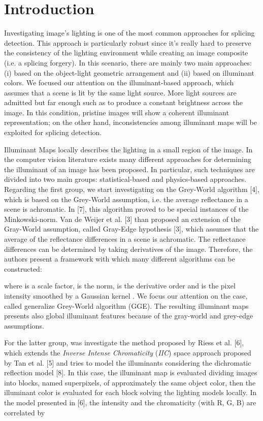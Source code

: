 \chapter*{Introduction}

Investigating image's lighting is one of the most common approaches for splicing detection. This approach is particularly robust since it's really hard to preserve the consistency of the lighting environment while creating an image composite (i.e. a splicing forgery). 
In this scenario, there are mainly two main approaches: (i) based on the object-light geometric arrangement and (ii) based on illuminant colors. We focused our attention on the illuminant-based approach, which assumes that a scene is lit by the same light source. More light sources are admitted but far enough such as to produce a constant brightness across the image. In this condition, pristine images will show a coherent illuminant representation; on the other hand, inconsistencies among illuminant maps will be exploited for splicing detection. 

Illuminant Maps locally describes the lighting in a small region of the image. In the computer vision literature exists many different approaches for determining the illuminant of an image has been proposed. In particular, such techniques are divided into two main groups: statistical-based and physics-based approaches.
Regarding the first group, we start investigating on the Grey-World algorithm [4], which is based on the Grey-World assumption, i.e. the average reflectance in a scene is achromatic. In [7], this algorithm proved to be special instances of the Minkowski-norm. Van de Weijer et al. [3] than proposed an extension of the Gray-World assumption, called Gray-Edge hypothesis [3], which assumes that the average of the reflectance differences in a scene is achromatic. The reflectance differences can be determined by taking derivatives of the image. Therefore, the authors present a framework with which many different algorithms can be constructed:

where  is a scale factor, is the norm,  is the derivative order and  is the pixel intensity smoothed by a Gaussian kernel . We focus our attention on the  case, called generalize Grey-World algorithm (GGE). The resulting illuminant maps presents also global illuminant features because of the gray-world and grey-edge assumptions.

For the latter group, was investigate the method proposed by Riess et al. [6], which extends the \emph{Inverse Intense Chromaticity} (\emph{IIC}) space approach proposed by Tan et al. [5] and tries to model the illuminants considering the dichromatic reflection model [8]. In this case, the illuminant map is evaluated dividing  images into blocks, named superpixels, of approximately the same object color, then the illuminant color is evaluated for each block solving the lighting models locally. In the model presented in [6], the intensity  and the chromaticity  (with  R, G, B) are correlated by


